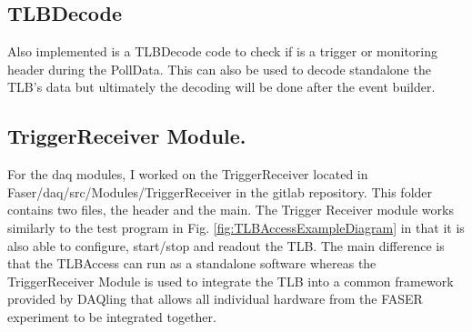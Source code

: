 \subsection{TLBDecode}

Also implemented is a TLBDecode code to check if is a trigger or monitoring header during the PollData. This can also be used to decode standalone the TLB's data but ultimately the decoding will be done after the event builder.

\subsection{TriggerReceiver Module.}

For the daq modules, I worked on the TriggerReceiver located in Faser/daq/src/Modules/TriggerReceiver in the gitlab repository. This folder contains two files, the header and the main. The Trigger Receiver module works similarly to the test program in Fig. \ref{fig:TLBAccessExampleDiagram} in that it is also able to configure, start/stop and readout the TLB. The main difference is that the TLBAccess can run as a standalone software whereas the TriggerReceiver Module is used to integrate the TLB into a common framework provided by DAQling that allows all individual hardware from the FASER experiment to be integrated together.